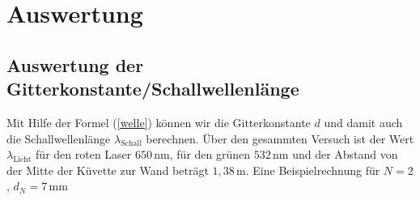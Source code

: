 \documentclass[fontsize=12pt]{scrartcl}
\begin{document}
\newpage
\noindent

\section{ Auswertung}

\subsection{Auswertung der Gitterkonstante/Schallwellenlänge}

Mit Hilfe der Formel (\ref{welle}) können wir die Gitterkonstante $d$ und damit auch die Schallwellenlänge $\lambda_{\text{Schall}}$ berechnen.
Über den gesammten Versuch ist der Wert $\lambda_{\text{Licht}}$ für den roten Laser $650\,$nm, für den grünen $532\,$nm und der Abstand von der Mitte der Küvette zur Wand beträgt $1,38\,$m.  
Eine Beispielrechnung für $N=2$, $d_N= 7\,$mm
\end{document}
